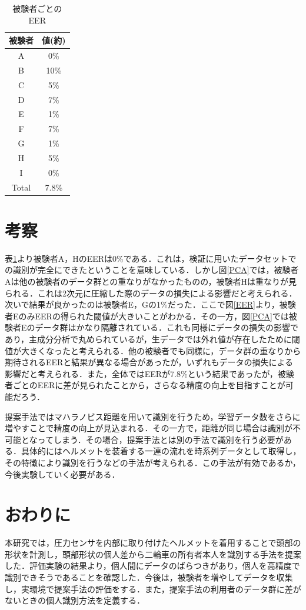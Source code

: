 \documentclass[Japanese]{dicomopapers}
\begin{document}
\begin{table}[htb]
  \center
  \begin{tabular}{|c|c|} \hline
    被験者 & 値(約) \\ \hline \hline
    A & 0\% \\
    B & 10\% \\
    C & 5\% \\
    D & 7\% \\
    E & 1\% \\
    F & 7\% \\
    G & 1\% \\
    H & 5\% \\
    I & 0\% \\ \hline
    Total & 7.8\% \\ \hline
  \end{tabular}
  \caption{被験者ごとのEER}
  \label{EER_num}
\end{table}

\section{考察}
表\ref{EER_num}より被験者A，HのEERは0\%である．これは，検証に用いたデータセットでの識別が完全にできたということを意味している．しかし図\ref{PCA}では，被験者Aは他の被験者のデータ群との重なりがなかったものの，被験者Hは重なりが見られる．これは2次元に圧縮した際のデータの損失による影響だと考えられる．次いで結果が良かったのは被験者E，Gの1\%だった．ここで図\ref{EER}より，被験者EのみEERの得られた閾値が大きいことがわかる．その一方，図\ref{PCA}では被験者Eのデータ群はかなり隔離されている．これも同様にデータの損失の影響であり，主成分分析で丸められているが，生データでは外れ値が存在したために閾値が大きくなったと考えられる．他の被験者でも同様に，データ群の重なりから期待されるEERと結果が異なる場合があったが，いずれもデータの損失による影響だと考えられる．また，全体ではEERが7.8\%という結果であったが，被験者ごとのEERに差が見られたことから，さらなる精度の向上を目指すことが可能だろう．\par
提案手法ではマハラノビス距離を用いて識別を行うため，学習データ数をさらに増やすことで精度の向上が見込まれる．その一方で，距離が同じ場合は識別が不可能となってしまう．その場合，提案手法とは別の手法で識別を行う必要がある．具体的にはヘルメットを装着する一連の流れを時系列データとして取得し，その特徴により識別を行うなどの手法が考えられる．この手法が有効であるか，今後実験していく必要がある．

\section{おわりに}
本研究では，圧力センサを内部に取り付けたヘルメットを着用することで頭部の形状を計測し，頭部形状の個人差から二輪車の所有者本人を識別する手法を提案した．評価実験の結果より，個人間にデータのばらつきがあり，個人を高精度で識別できそうであることを確認した．今後は，被験者を増やしてデータを収集し，実環境で提案手法の評価をする．また，提案手法の利用者のデータ群に差がないときの個人識別方法を定義する．



\end{document}
